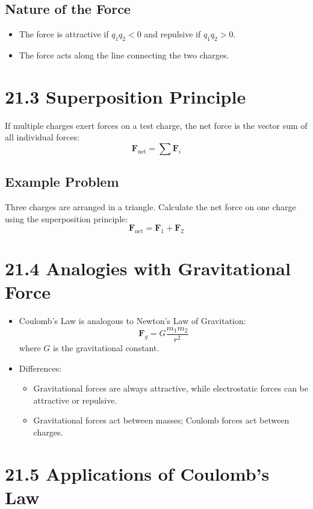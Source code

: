 \documentclass{article}
\begin{document}
\subsection*{Nature of the Force}
\begin{itemize}
    \item The force is attractive if \( q_1 q_2 < 0 \) and repulsive if \( q_1 q_2 > 0 \).
    \item The force acts along the line connecting the two charges.
\end{itemize}

\section*{21.3 Superposition Principle}
If multiple charges exert forces on a test charge, the net force is the vector sum of all individual forces:
\[
\mathbf{F}_{\text{net}} = \sum \mathbf{F}_i
\]

\subsection*{Example Problem}
Three charges are arranged in a triangle. Calculate the net force on one charge using the superposition principle:
\[
\mathbf{F}_{\text{net}} = \mathbf{F}_1 + \mathbf{F}_2
\]

\section*{21.4 Analogies with Gravitational Force}
\begin{itemize}
    \item Coulomb's Law is analogous to Newton's Law of Gravitation:
    \[
    \mathbf{F}_g = G \frac{m_1 m_2}{r^2}
    \]
    where \( G \) is the gravitational constant.
    \item Differences:
    \begin{itemize}
        \item Gravitational forces are always attractive, while electrostatic forces can be attractive or repulsive.
        \item Gravitational forces act between masses; Coulomb forces act between charges.
    \end{itemize}
\end{itemize}

\section*{21.5 Applications of Coulomb's Law}
\end{document}
